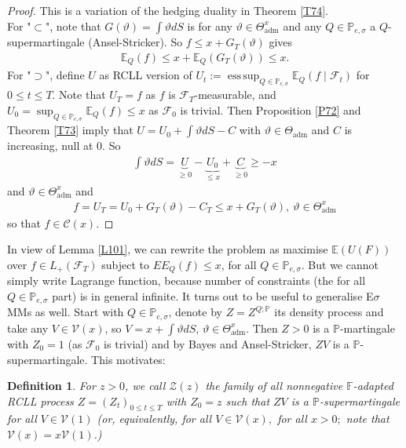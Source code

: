 \documentclass[12pt,a4paper, twoside]{article}
\newtheorem{defn}{Definition}[section]
\theoremstyle{definition}
\newcommand{\EE}{\mathbb{E}} %
\newcommand{\PP}{\mathbb{P}} %
\DeclareMathOperator*{\esssup}{ess\,sup}
\begin{document}
\begin{proof} This is a variation of the hedging duality in Theorem \ref{T74}. \\
For "$\subset$", note that $G( \vartheta) = \int \vartheta dS$ is for any $\vartheta \in \Theta_\text{adm}^x$ and any $Q \in \PP_{e, \sigma}$ a $Q$-supermartingale (Ansel-Stricker). So $f \leq x + G_T( \vartheta)$ gives \begin{align*}
\EE_Q(f) \leq x + \EE_Q(G_T( \vartheta)) \leq x. 
\end{align*}
For "$\supset$", define $U$ as RCLL version of $U_t:= \esssup_{Q \in \PP_{e, \sigma}} \EE_Q(f \mid \mathcal{F}_t)$ for $0 \leq t \leq T$. Note that $U_T=f$ as $f$ is $\mathcal{F}_T$-measurable, and $U_0 = \sup_{Q \in \PP_{e, \sigma}} \EE_Q(f) \leq x$ as $\mathcal{F}_0$ is trivial. Then Proposition \ref{P72} and Theorem \ref{T73} imply that $U= U_0 + \int \vartheta dS -C$ with $\vartheta \in \Theta_\text{adm}$ and $C$ is increasing, null at $0$. So \begin{align*}
\int \vartheta dS = \underbrace{U}_{ \geq 0}-\underbrace{U_0}_{ \leq x}+\underbrace{C}_{ \geq 0} \geq -x
\end{align*}
and $\vartheta \in \Theta_\text{adm}^x$ and 
\begin{align*}
f= U_T=U_0 + G_T( \vartheta)-C_T \leq x + G_T( \vartheta), \ \vartheta \in \Theta_\text{adm}^x
\end{align*}
so that $f \in \mathcal{C}(x)$. 
\end{proof}
In view of Lemma \ref{L101}, we can rewrite the problem as maximise $\EE(U(F))$ over $f \in L_+( \mathcal{F}_T)$ subject to $EE_Q(f) \leq x$, for all $Q \in \PP_{e, \sigma}$. But we cannot simply write Lagrange function, because number of constraints (the for all $Q \in \PP_{e, \sigma}$ part) is in general infinite. 
\newpage
It turns out to be useful to generalise E$\sigma$MMs as well. Start with $Q \in \PP_{e, \sigma}$, denote by $Z=Z^{Q;\PP}$ its density process and take any $V \in \mathcal{V}(x)$, so $V= x + \int \vartheta dS$, $\vartheta \in \Theta_\text{adm}^x$. Then $Z>0$ is a $\PP$-martingale with $Z_0=1$ (as $\mathcal{F}_0$ is trivial) and by Bayes and Ansel-Stricker, $ZV$ is a $\PP$-supermartingale. This motivates: 
\begin{defn} For $z>0$, we call $\mathcal{Z}(z)$ the family of all nonnegative $\mathbb{F}$-adapted RCLL process $Z=(Z_t)_{0 \leq t \leq T}$ with $Z_0=z$ such that $ZV$ is a $\PP$-supermartingale for all $V \in \mathcal{V}(1)$ (or, equivalently, for all $V \in \mathcal{V}(x),$ for all $x >0;$ note that $\mathcal{V}(x) = x  \mathcal{V}(1)$.)
\end{defn}
\end{document}
